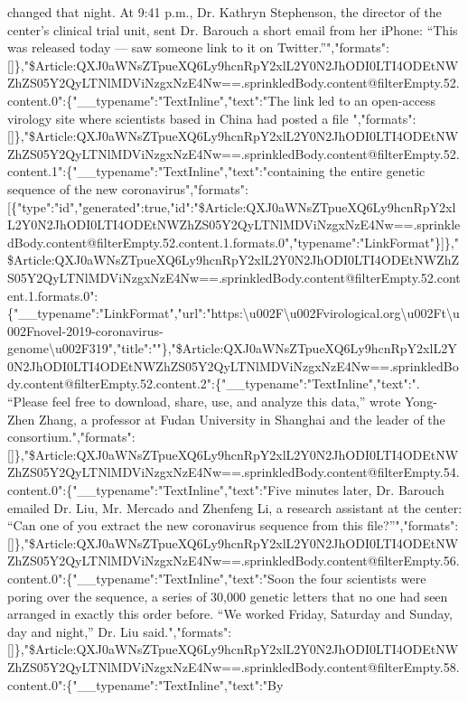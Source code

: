 changed that night. At 9:41 p.m., Dr. Kathryn Stephenson, the director
of the center's clinical trial unit, sent Dr. Barouch a short email from
her iPhone: ``This was released today --- saw someone link to it on
Twitter.''","formats":{[}{]}\},"\$Article:QXJ0aWNsZTpueXQ6Ly9hcnRpY2xlL2Y0N2JhODI0LTI4ODEtNWZhZS05Y2QyLTNlMDViNzgxNzE4Nw==.sprinkledBody.content@filterEmpty.52.content.0":\{"\_\_typename":"TextInline","text":"The
link led to an open-access virology site where scientists based in China
had posted a file
","formats":{[}{]}\},"\$Article:QXJ0aWNsZTpueXQ6Ly9hcnRpY2xlL2Y0N2JhODI0LTI4ODEtNWZhZS05Y2QyLTNlMDViNzgxNzE4Nw==.sprinkledBody.content@filterEmpty.52.content.1":\{"\_\_typename":"TextInline","text":"containing
the entire genetic sequence of the new
coronavirus","formats":{[}\{"type":"id","generated":true,"id":"\$Article:QXJ0aWNsZTpueXQ6Ly9hcnRpY2xlL2Y0N2JhODI0LTI4ODEtNWZhZS05Y2QyLTNlMDViNzgxNzE4Nw==.sprinkledBody.content@filterEmpty.52.content.1.formats.0","typename":"LinkFormat"\}{]}\},"\$Article:QXJ0aWNsZTpueXQ6Ly9hcnRpY2xlL2Y0N2JhODI0LTI4ODEtNWZhZS05Y2QyLTNlMDViNzgxNzE4Nw==.sprinkledBody.content@filterEmpty.52.content.1.formats.0":\{"\_\_typename":"LinkFormat","url":"https:\textbackslash{}u002F\textbackslash{}u002Fvirological.org\textbackslash{}u002Ft\textbackslash{}u002Fnovel-2019-coronavirus-genome\textbackslash{}u002F319","title":""\},"\$Article:QXJ0aWNsZTpueXQ6Ly9hcnRpY2xlL2Y0N2JhODI0LTI4ODEtNWZhZS05Y2QyLTNlMDViNzgxNzE4Nw==.sprinkledBody.content@filterEmpty.52.content.2":\{"\_\_typename":"TextInline","text":".
``Please feel free to download, share, use, and analyze this data,''
wrote Yong-Zhen Zhang, a professor at Fudan University in Shanghai and
the leader of the
consortium.","formats":{[}{]}\},"\$Article:QXJ0aWNsZTpueXQ6Ly9hcnRpY2xlL2Y0N2JhODI0LTI4ODEtNWZhZS05Y2QyLTNlMDViNzgxNzE4Nw==.sprinkledBody.content@filterEmpty.54.content.0":\{"\_\_typename":"TextInline","text":"Five
minutes later, Dr. Barouch emailed Dr. Liu, Mr. Mercado and Zhenfeng Li,
a research assistant at the center: ``Can one of you extract the new
coronavirus sequence from this
file?''","formats":{[}{]}\},"\$Article:QXJ0aWNsZTpueXQ6Ly9hcnRpY2xlL2Y0N2JhODI0LTI4ODEtNWZhZS05Y2QyLTNlMDViNzgxNzE4Nw==.sprinkledBody.content@filterEmpty.56.content.0":\{"\_\_typename":"TextInline","text":"Soon
the four scientists were poring over the sequence, a series of 30,000
genetic letters that no one had seen arranged in exactly this order
before. ``We worked Friday, Saturday and Sunday, day and night,'' Dr.
Liu
said.","formats":{[}{]}\},"\$Article:QXJ0aWNsZTpueXQ6Ly9hcnRpY2xlL2Y0N2JhODI0LTI4ODEtNWZhZS05Y2QyLTNlMDViNzgxNzE4Nw==.sprinkledBody.content@filterEmpty.58.content.0":\{"\_\_typename":"TextInline","text":"By
